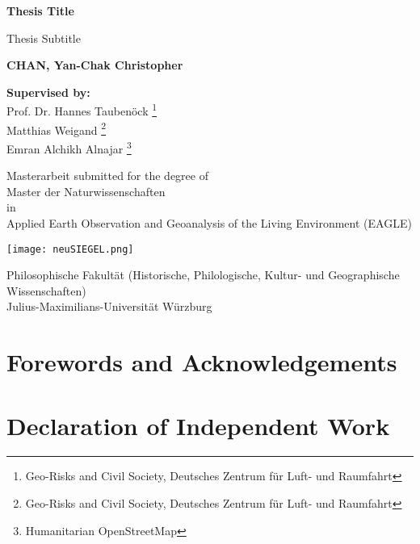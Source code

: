 \documentclass[11pt, a4paper, twoside]{report}
\begin{document}
\begin{titlepage}
   \begin{center}
       \vspace*{1cm}

       \huge
       \textbf{Thesis Title}

       \vspace{0.5cm}
       \Large
       Thesis Subtitle

       \vspace{1.5cm}

       \textbf{CHAN, Yan-Chak Christopher}

       \vspace{0.5cm}
       \textbf{Supervised by:} \\
       Prof. Dr. Hannes Taubenöck \thanks{Geo-Risks and Civil Society, Deutsches Zentrum für Luft- und Raumfahrt} \\
       Matthias Weigand \thanks{Geo-Risks and Civil Society, Deutsches Zentrum für Luft- und Raumfahrt}\\
       Emran Alchikh Alnajar \thanks{Humanitarian OpenStreetMap}

       \vfill

       Masterarbeit submitted for the degree of\\
       Master der Naturwissenschaften\\
       in\\
       Applied Earth Observation and Geoanalysis of the Living Environment (EAGLE)

       \vspace{0.8cm}

       \texttt{[image: neuSIEGEL.png]}

       \normalsize
       Philosophische Fakultät (Historische, Philologische, Kultur- und Geographische Wissenschaften)\\
       Julius-Maximilians-Universität Würzburg\\
   \end{center}
\end{titlepage}

\newpage

\section{Forewords and Acknowledgements}
\pagestyle{empty}

\newpage

\section{Declaration of Independent Work}
\pagestyle{empty}
\end{document}
